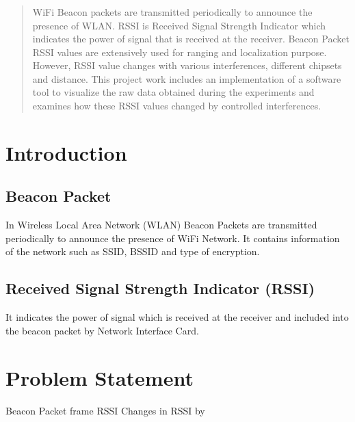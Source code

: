 \documentclass[11pt,a4paper,headinclude,footinclude,chapterprefix=on]{scrreprt}
\begin{document}
\begin{abstract}
	\subsection*{\abstractname} WiFi Beacon packets are transmitted periodically to announce the presence of WLAN. RSSI is Received Signal Strength Indicator which indicates the power of signal that is received at the receiver. Beacon Packet RSSI values are extensively used for ranging and localization purpose. However, RSSI value changes with various interferences, different chipsets and distance. This project work includes an implementation of a software tool to visualize the raw data obtained during the experiments and examines how these RSSI values changed by controlled interferences. 
\end{abstract}

\tableofcontents

{ 
\chapter{Introduction} 
\section*{Beacon Packet} In Wireless Local Area Network (WLAN) Beacon Packets are transmitted periodically to announce the presence of WiFi Network. It contains information of the network such as SSID, BSSID and type of encryption.

\section*{Received Signal Strength Indicator (RSSI)} It indicates the power of signal which is received at the receiver and included into the beacon packet by Network Interface Card. }

\chapter{Problem Statement}
Beacon Packet frame RSSI
Changes in RSSI by 
\end{document}
